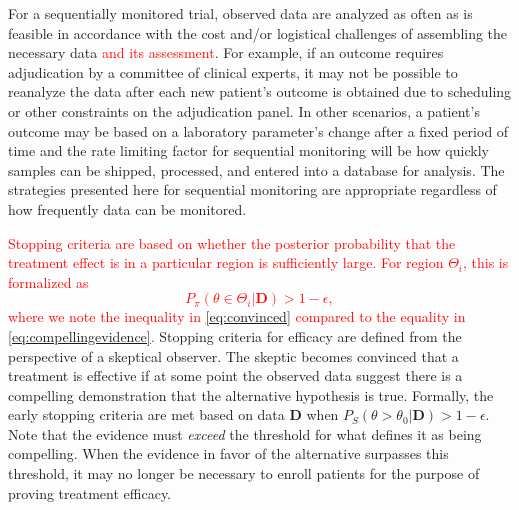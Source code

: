 \documentclass[12pt]{article}
\begin{document}
For a sequentially monitored trial, observed data are analyzed as often as is feasible in accordance with 
the cost and/or logistical challenges of assembling the necessary data \textcolor{red}{and its assessment}.
%
For example, if an outcome requires adjudication by a committee of clinical experts, it may not be possible to reanalyze the
data after each new patient's outcome is obtained due to scheduling or other constraints on the adjudication panel.
%
In other scenarios, a patient's outcome may be based on a laboratory parameter's change after a fixed period of time
and the rate limiting factor for sequential monitoring will be how quickly samples can be shipped, processed, and entered
into a database for analysis.  
%
The strategies presented here for sequential monitoring are appropriate regardless of how frequently data can be monitored.


\textcolor{red}{Stopping criteria are based on whether the posterior probability that the treatment effect is in a particular region is sufficiently large. For region $\Theta_i$, this is formalized as
\begin{equation}\label{eq:convinced}
		P_\pi(\theta\in\Theta_i|\mathbf{D}) > 1-\epsilon,
\end{equation} 
where we note the inequality in \eqref{eq:convinced} compared to the equality in \eqref{eq:compellingevidence}.
}
Stopping criteria for efficacy are defined from the perspective of a skeptical observer. 
The skeptic becomes convinced that a treatment is effective if at some point the observed data suggest there is 
a compelling demonstration that the alternative hypothesis is true. 
Formally, the early stopping criteria are met based on data $\mathbf{D}$ when $P_S(\theta>\theta_0|\mathbf{D})>1-\epsilon$.
Note that the evidence must \textit{exceed} the threshold for what defines it as being compelling.
When the evidence in favor of the alternative surpasses this threshold, it may no longer be necessary to 
enroll patients for the purpose of proving treatment efficacy.
\end{document}
